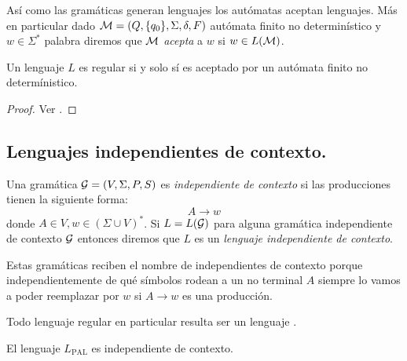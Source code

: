 \documentclass[tesis.tex]{subfiles}
\begin{document}
Así como las gramáticas generan lenguajes los autómatas aceptan lenguajes.
Más en particular dado ${\cal M} = (Q,\{q_0\},\Sigma,\delta,F)$ autómata finito no determinístico y $w \in \Sigma^*$ palabra diremos que $\cal M$ \emph{acepta} a $w$ si $w \in L(\cal M)$.


\begin{teo}
	Un lenguaje $L$ es regular si y solo sí es aceptado por un autómata finito no determínistico.
\end{teo}

\begin{proof}
	Ver \cite[pp.218-219]{hopcraft-ullman}.
\end{proof}


\subsection{Lenguajes independientes de contexto.} \label{subs_ic}
\begin{deff}
	Una gramática ${\cal G} = (V, \Sigma, P, S) $ es \emph{independiente de contexto} si las producciones tienen la siguiente forma:
	\begin{equation*}
		A \to w
	\end{equation*}
	donde $A \in V, w \in (\Sigma \cup V)^*$.  
	Si $L=L({\cal G})$ para alguna gramática independiente de contexto $\cal G$ entonces diremos que $L$ es un \emph{lenguaje independiente de contexto}.
\end{deff}
Estas gramáticas reciben el nombre de independientes de contexto porque independientemente de qué símbolos rodean a un no terminal $A$ siempre lo vamos a poder reemplazar por $w$ si $A \to w$ es una producción.

\begin{obs}
	Todo lenguaje regular en particular resulta ser un lenguaje \ic.
\end{obs}


\begin{prop}\label{leng_ej_gram_palindromos}
	El lenguaje $ L_{\text{PAL}}$ es independiente de contexto. 
\end{prop}
\end{document}
